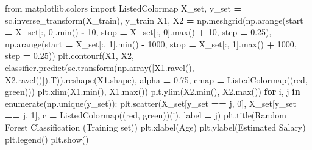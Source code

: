 \documentclass[
]{book}
\newenvironment{Shaded}{\begin{snugshade}}{\end{snugshade}}
\newcommand{\BuiltInTok}[1]{#1}
\newcommand{\ControlFlowTok}[1]{\textcolor[rgb]{0.13,0.29,0.53}{\textbf{#1}}}
\newcommand{\DecValTok}[1]{\textcolor[rgb]{0.00,0.00,0.81}{#1}}
\newcommand{\FloatTok}[1]{\textcolor[rgb]{0.00,0.00,0.81}{#1}}
\newcommand{\ImportTok}[1]{#1}
\newcommand{\KeywordTok}[1]{\textcolor[rgb]{0.13,0.29,0.53}{\textbf{#1}}}
\newcommand{\NormalTok}[1]{#1}
\newcommand{\OperatorTok}[1]{\textcolor[rgb]{0.81,0.36,0.00}{\textbf{#1}}}
\newcommand{\StringTok}[1]{\textcolor[rgb]{0.31,0.60,0.02}{#1}}
\theoremstyle{definition}
\theoremstyle{definition}
\theoremstyle{definition}
\theoremstyle{definition}
\theoremstyle{remark}
\begin{document}
\begin{Shaded}
\begin{Highlighting}[]
\ImportTok{from}\NormalTok{ matplotlib.colors }\ImportTok{import}\NormalTok{ ListedColormap}
\NormalTok{X\_set, y\_set }\OperatorTok{=}\NormalTok{ sc.inverse\_transform(X\_train), y\_train}
\NormalTok{X1, X2 }\OperatorTok{=}\NormalTok{ np.meshgrid(np.arange(start }\OperatorTok{=}\NormalTok{ X\_set[:, }\DecValTok{0}\NormalTok{].}\BuiltInTok{min}\NormalTok{() }\OperatorTok{{-}} \DecValTok{10}\NormalTok{, stop }\OperatorTok{=}\NormalTok{ X\_set[:, }\DecValTok{0}\NormalTok{].}\BuiltInTok{max}\NormalTok{() }\OperatorTok{+} \DecValTok{10}\NormalTok{, step }\OperatorTok{=} \FloatTok{0.25}\NormalTok{),}
\NormalTok{                     np.arange(start }\OperatorTok{=}\NormalTok{ X\_set[:, }\DecValTok{1}\NormalTok{].}\BuiltInTok{min}\NormalTok{() }\OperatorTok{{-}} \DecValTok{1000}\NormalTok{, stop }\OperatorTok{=}\NormalTok{ X\_set[:, }\DecValTok{1}\NormalTok{].}\BuiltInTok{max}\NormalTok{() }\OperatorTok{+} \DecValTok{1000}\NormalTok{, step }\OperatorTok{=} \FloatTok{0.25}\NormalTok{))}
\NormalTok{plt.contourf(X1, X2, classifier.predict(sc.transform(np.array([X1.ravel(), X2.ravel()]).T)).reshape(X1.shape),}
\NormalTok{             alpha }\OperatorTok{=} \FloatTok{0.75}\NormalTok{, cmap }\OperatorTok{=}\NormalTok{ ListedColormap((}\StringTok{\textquotesingle{}red\textquotesingle{}}\NormalTok{, }\StringTok{\textquotesingle{}green\textquotesingle{}}\NormalTok{)))}
\NormalTok{plt.xlim(X1.}\BuiltInTok{min}\NormalTok{(), X1.}\BuiltInTok{max}\NormalTok{())}
\NormalTok{plt.ylim(X2.}\BuiltInTok{min}\NormalTok{(), X2.}\BuiltInTok{max}\NormalTok{())}
\ControlFlowTok{for}\NormalTok{ i, j }\KeywordTok{in} \BuiltInTok{enumerate}\NormalTok{(np.unique(y\_set)):}
\NormalTok{    plt.scatter(X\_set[y\_set }\OperatorTok{==}\NormalTok{ j, }\DecValTok{0}\NormalTok{], X\_set[y\_set }\OperatorTok{==}\NormalTok{ j, }\DecValTok{1}\NormalTok{], c }\OperatorTok{=}\NormalTok{ ListedColormap((}\StringTok{\textquotesingle{}red\textquotesingle{}}\NormalTok{, }\StringTok{\textquotesingle{}green\textquotesingle{}}\NormalTok{))(i), label }\OperatorTok{=}\NormalTok{ j)}
\NormalTok{plt.title(}\StringTok{\textquotesingle{}Random Forest Classification (Training set)\textquotesingle{}}\NormalTok{)}
\NormalTok{plt.xlabel(}\StringTok{\textquotesingle{}Age\textquotesingle{}}\NormalTok{)}
\NormalTok{plt.ylabel(}\StringTok{\textquotesingle{}Estimated Salary\textquotesingle{}}\NormalTok{)}
\NormalTok{plt.legend()}
\NormalTok{plt.show()}
\end{Highlighting}
\end{Shaded}
\end{document}
